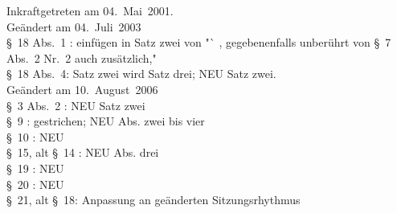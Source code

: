 \nopagebreak
\vspace{1cm}
Inkraftgetreten am 04.~Mai~2001.
\\ 
  

\footnotesize
Geändert am 04.~Juli~2003\\
§~18 Abs.~1 : einfügen in Satz zwei von "` , gegebenenfalls unberührt von §~7 Abs.~2 Nr.~2 auch zusätzlich,"\\
§~18 Abs.~4: Satz zwei wird Satz drei; NEU Satz zwei.\\

Geändert am 10.~August~2006\\
§~3 Abs.~2 : NEU Satz zwei\\
§~9 : gestrichen;  NEU Abs. zwei bis vier\\
§~10 : NEU\\
§~15, alt \S~14 : NEU Abs. drei\\
§~19 : NEU\\
§~20 : NEU\\
§~21, alt §~18: Anpassung an geänderten Sitzungsrhythmus

